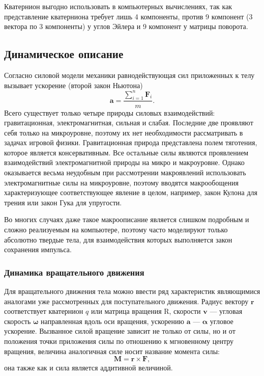 Кватернион выгодно использовать в компьютерных вычислениях, так как представление кватерниона требует
лишь 4 компоненты, против 9 компонент (3 вектора по 3 компоненты) у углов Эйлера и 9 компонент у матрицы поворота.

\subsection{Динамическое описание}
Согласно силовой модели механики равнодействующая сил приложенных к телу вызывает ускорение (второй закон Ньютона)
\begin{equation}
 \mathbf{a}=\frac{\sum\limits_{i=1}^n{\mathbf{F}_i}}{m}.
\end{equation}
Всего существует только четыре природы силовых взаимодействий: гравитационная, электромагнитная, сильная и слабая.
Последние две проявляют себя только на микроуровне, поэтому их нет необходимости рассматривать в задачах
игровой физики. Гравитационная природа представлена полем тяготения, которое является консервативным. 
Все остальные силы являются проявлением взаимодействий электромагнитной природы на микро и макроуровне.
Однако оказывается весьма неудобным при рассмотрении макроявлений использовать электромагнитные силы на микроуровне,
поэтому вводятся макрообощения характеризующее соответствующее явление в целом, например, закон Кулона
для трения или закон Гука для упругости.

Во многих случаях даже такое макроописание является слишком подробным и сложно реализуемым на компьютере,
поэтому часто моделируют только абсолютно твердые тела, для взаимодействия которых выполняется закон 
сохранения импульса.
\subsubsection{Динамика вращательного движения}
Для вращательного движения тела можно ввести ряд характеристик
являющимися аналогами уже рассмотренных для поступательного движения.
Радиус вектору $ \mathbf{r} $ соответствует кватернион $q$ или матрица вращения $\mathrm{R}$,
скорости $\mathbf{v}$ --- угловая скорость $\boldsymbol{\omega}$ направленная вдоль оси вращения,
ускорению $\mathbf{a}$ --- $\boldsymbol{\alpha}$ угловое ускорение.
Вызванное силой вращение зависит не только от силы, но и от положения точки приложения силы
по отношению к мгновенному центру вращения, величина аналогичная силе носит название момента силы:
\begin{equation}
 \mathbf{M} = \mathbf{r}\times{\mathbf{F}}, 
\end{equation}
она также как и сила является аддитивной величиной.

